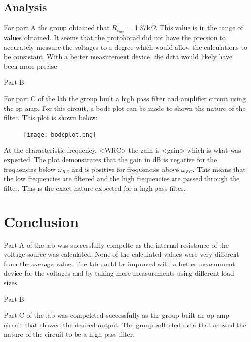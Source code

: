 \documentclass[twocolumn, amsmath]{revtex4}
\begin{document}
\subsection{Analysis}
For part A the group obtained that $R_{o_{ave}}$ = 1.37k$\Omega$. This value is in the range of values obtained. It seems that the protoborad did not have the precsion to accurately measure the voltages to a degree which would allow the calculations to be consistant. With a better measurement device, the data would likely have been more precise.

Part B

For part C of the lab the group built a high pass filter and amplifier circuit using the op amp. For this circuit, a bode plot can be made to shown the nature of the filter. This plot is shown below:

\begin{figure}[h]
    \texttt{[image: bodeplot.png]}  
    \caption{}
\end{figure}

At the characteristic frequency, <WRC> the gain is <gain> which is what was expected. The plot demonstrates that the gain in dB is negative for the frequencies below $\omega_{RC}$ and is positive for frequencies above $\omega_{RC}$. This means that the low frequencies are filtered and the high frequencies are passed through the filter. This is the exact nature expected for a high pass filter.

\section{Conclusion}
Part A of the lab was successfully compelte as the internal resistance of the voltage source was calculated. None of the calculated values were very different from the average value. The lab could be improved with a better measurment device for the voltages and by taking more measurements using different load sizes.

Part B 

Part C of the lab was compeleted successfully as the group built an op amp circuit that showed the desired output. The group collected data that showed the nature of the circuit to be a high pass filter.
\end{document}

